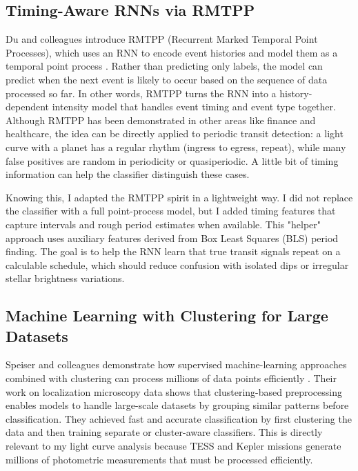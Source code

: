 \documentclass[letterpaper]{article}
\begin{document}
\subsection{Timing-Aware RNNs via RMTPP}

Du and colleagues introduce RMTPP (Recurrent Marked Temporal Point Processes), which uses an RNN to encode event histories and model them as a temporal point process \cite{Du2016markedtemporalpoint}. Rather than predicting only labels, the model can predict when the next event is likely to occur based on the sequence of data processed so far. In other words, RMTPP turns the RNN into a history-dependent intensity model that handles event timing and event type together. Although RMTPP has been demonstrated in other areas like finance and healthcare, the idea can be directly applied to periodic transit detection: a light curve with a planet has a regular rhythm (ingress to egress, repeat), while many false positives are random in periodicity or quasiperiodic. A little bit of timing information can help the classifier distinguish these cases.

Knowing this, I adapted the RMTPP spirit in a lightweight way. I did not replace the classifier with a full point-process model, but I added timing features that capture intervals and rough period estimates when available. This "helper" approach uses auxiliary features derived from Box Least Squares (BLS) period finding. The goal is to help the RNN learn that true transit signals repeat on a calculable schedule, which should reduce confusion with isolated dips or irregular stellar brightness variations.

\subsection{Machine Learning with Clustering for Large Datasets}

Speiser and colleagues demonstrate how supervised machine-learning approaches combined with clustering can process millions of data points efficiently \cite{Speiser2020clustering}. Their work on localization microscopy data shows that clustering-based preprocessing enables models to handle large-scale datasets by grouping similar patterns before classification. They achieved fast and accurate classification by first clustering the data and then training separate or cluster-aware classifiers. This is directly relevant to my light curve analysis because TESS and Kepler missions generate millions of photometric measurements that must be processed efficiently.
\end{document}
